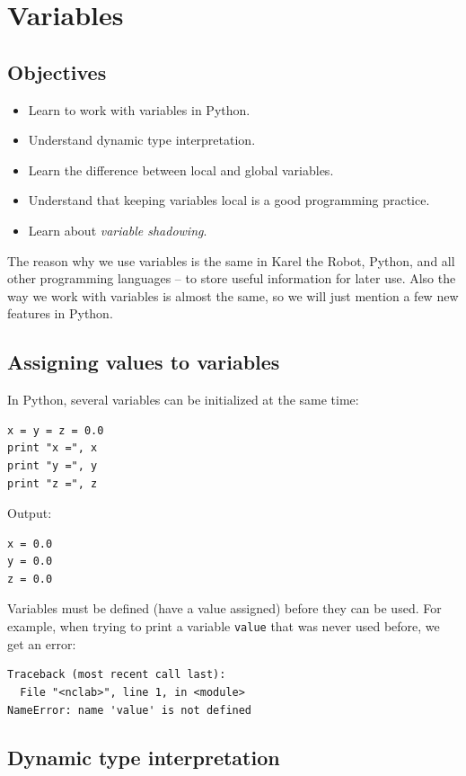 \section{Variables}

\subsection{Objectives}

\begin{itemize}
\item Learn to work with variables in Python.
\item Understand dynamic type interpretation.
\item Learn the difference between local and global variables.
\item Understand that keeping variables local is a good programming practice.
\item Learn about {\em variable shadowing}.
\end{itemize}
The reason why we use variables is the same in Karel the Robot, Python, and all other programming 
languages -- to store useful information for later use. Also the way we work with variables is almost the 
same, so we will just mention a few new features in Python.

\subsection{Assigning values to variables}

In Python, several variables can be initialized at the same time:

\begin{verbatim}
x = y = z = 0.0
print "x =", x
print "y =", y
print "z =", z
\end{verbatim}
Output:

\begin{verbatim}
x = 0.0
y = 0.0
z = 0.0
\end{verbatim}
Variables must be defined (have a value assigned) before they can be 
used. For example, when trying to print a variable {\tt value} that 
was never used before, we get an error:

\begin{verbatim}
Traceback (most recent call last):
  File "<nclab>", line 1, in <module>
NameError: name 'value' is not defined
\end{verbatim}

\subsection{Dynamic type interpretation}

